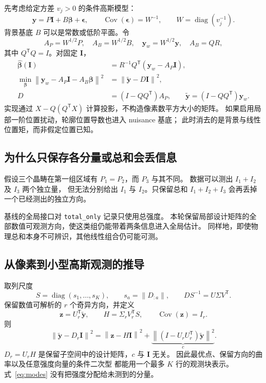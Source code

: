 \documentclass[UTF8,11pt,a4paper,fontset=fandol]{ctexart}
\newcommand{\diag}{\operatorname{diag}}
\newcommand{\Cov}{\operatorname{Cov}}
\newcommand{\norm}[1]{\left\lVert#1\right\rVert}
\newcommand{\T}{^{\mathsf T}}
\begin{document}
先考虑给定方差 $v_j>0$ 的条件高斯模型：
\begin{equation}
\bm y=P\bm I+B\bm\beta+\bm\epsilon,\qquad
\Cov(\bm\epsilon)=W^{-1},\qquad W=\diag(v_j^{-1}).
\end{equation}
背景基底 $B$ 可以是常数或低阶平面。令
\begin{equation}
A_P=W^{1/2}P,\quad A_B=W^{1/2}B,\quad
\bm y_w=W^{1/2}\bm y,\quad A_B=QR,
\end{equation}
其中 $Q\T Q=I$。对固定 $\bm I$，
\begin{align}
\widehat{\bm\beta}(\bm I)&=R^{-1}Q\T(\bm y_w-A_P\bm I),\\
\min_{\bm\beta}\norm{\bm y_w-A_P\bm I-A_B\bm\beta}^2
&=\norm{\widetilde{\bm y}-D\bm I}^2,\\
D&=(I-QQ\T)A_P,\qquad
\widetilde{\bm y}=(I-QQ\T)\bm y_w.
\end{align}
实现通过 $X-Q(Q\T X)$ 计算投影，不构造像素数平方大小的矩阵。
如果启用局部一阶位置扰动，轮廓位置导数也进入 nuisance 基底；
此时消去的是背景与线性位置矩，而非假定位置已知。

\subsection{为什么只保存各分量或总和会丢信息}

假设三个晶畴在第一组区域有 $P_1=P_2$，而 $P_3$ 与其不同。
数据可以测出 $I_1+I_2$ 及 $I_3$ 两个独立量，
但无法分别给出 $I_1$ 与 $I_2$。只保留总和 $I_1+I_2+I_3$
会再丢掉一个已经测出的独立方向。

基线的全局接口对 \texttt{total\_only} 记录只使用总强度。
本轮保留局部设计矩阵的全部数值可观测方向，使这类组仍能带着两条信息进入全局估计。
同样地，即使物理总和本身不可辨识，其他线性组合仍可能可测。

\subsection{从像素到小型高斯观测的推导}

取列尺度
\begin{equation}
S=\diag(s_1,\ldots,s_K),\qquad s_a=\norm{D_{:a}},\qquad
DS^{-1}=U\Sigma V\T.
\end{equation}
保留数值可解析的 $r$ 个奇异方向，并定义
\begin{equation}\label{eq:modes}
\boxed{\quad \bm z=U_r\T\widetilde{\bm y},\qquad
H=\Sigma_rV_r\T S,\qquad \Cov(\bm z)=I_r.\quad}
\end{equation}
则
\begin{equation}\label{eq:modeidentity}
\norm{\widetilde{\bm y}-D_r\bm I}^2
=\norm{\bm z-H\bm I}^2+
\underbrace{\norm{(I-U_rU_r\T)\widetilde{\bm y}}^2}_{c}.
\end{equation}
$D_r=U_rH$ 是保留子空间中的设计矩阵，$c$ 与 $\bm I$ 无关。
因此最优点、保留方向的曲率以及任意强度向量的条件二次型
都能用一个最多 $K$ 行的观测块表示。式~\eqref{eq:modes}
没有把强度分配给未测到的分量。
\end{document}
